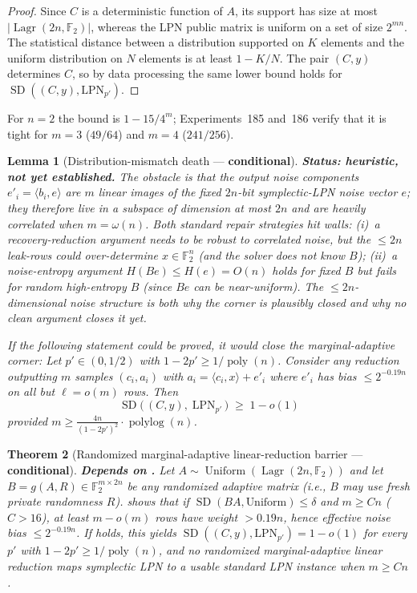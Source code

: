 \documentclass[11pt,a4paper]{article}
\theoremstyle{plain}
\newtheorem{theorem}{Theorem}[section]
\newtheorem{lemma}[theorem]{Lemma}
\theoremstyle{definition}
\newcommand{\F}{\mathbb{F}}
\DeclareMathOperator{\Lagr}{Lagr}
\begin{document}
\begin{proof}
Since $C$ is a deterministic function of $A$, its support has size at most $|\Lagr(2n,\F_2)|$, whereas the LPN public matrix is uniform on a set of size $2^{mn}$.  The statistical distance between a distribution supported on $K$ elements and the uniform distribution on $N$ elements is at least $1-K/N$.  The pair $(C,y)$ determines $C$, so by data processing the same lower bound holds for $\operatorname{SD}((C,y),\mathrm{LPN}_{p'})$.
\end{proof}

For $n=2$ the bound is $1-15/4^m$; Experiments~185 and~186 verify that it is tight for $m=3$ ($49/64$) and $m=4$ ($241/256$).

\begin{lemma}[Distribution-mismatch death --- \textbf{conditional}]
\label{lem:m2}
\textbf{Status: heuristic, not yet established.}  The obstacle is that the output noise components $e'_i=\langle b_i,e\rangle$ are $m$ linear images of the fixed $2n$-bit symplectic-LPN noise vector $e$; they therefore live in a subspace of dimension at most $2n$ and are heavily correlated when $m=\omega(n)$.  Both standard repair strategies hit walls: (i)~a recovery-reduction argument needs  to be robust to correlated noise, but the $\le 2n$ leak-rows could over-determine $x\in\F_2^{n}$ (and the solver does not know $B$); (ii)~a noise-entropy argument $H(Be)\le H(e)=O(n)$ holds for fixed $B$ but fails for random high-entropy $B$ (since $Be$ can be near-uniform).  The $\le 2n$-dimensional noise structure is both why the corner is plausibly closed and why no clean argument closes it yet.

\emph{If} the following statement could be proved, it would close the marginal-adaptive corner: Let $p'\in(0,1/2)$ with $1-2p'\ge 1/\operatorname{poly}(n)$.  Consider any reduction outputting $m$ samples $(c_i,a_i)$ with $a_i=\langle c_i,x\rangle+e'_i$ where $e'_i$ has bias $\le 2^{-0.19n}$ on all but $\ell=o(m)$ rows.  Then
\[
\operatorname{SD}\bigl(\,(C,y),\;\mathrm{LPN}_{p'}\,\bigr)
\;\ge\;
1-o(1)
\]
provided $m\ge \frac{4n}{(1-2p')^{2}}\cdot\operatorname{polylog}(n)$.
\end{lemma}

\begin{theorem}[Randomized marginal-adaptive linear-reduction barrier --- \textbf{conditional}]
\label{thm:marginal-adaptive}
\textbf{Depends on .}  Let $A\sim\operatorname{Uniform}(\Lagr(2n,\F_2))$ and let $B=g(A,R)\in\F_2^{m\times 2n}$ be any randomized adaptive matrix (i.e., $B$ may use fresh private randomness $R$).   shows that if $\operatorname{SD}(BA,\text{Uniform})\le\delta$ and $m\ge Cn$ ($C>16$), at least $m-o(m)$ rows have weight $>0.19n$, hence effective noise bias $\le 2^{-0.19n}$.  If  holds, this yields $\operatorname{SD}((C,y),\mathrm{LPN}_{p'})=1-o(1)$ for every $p'$ with $1-2p'\ge 1/\operatorname{poly}(n)$, and no randomized marginal-adaptive linear reduction maps symplectic LPN to a usable standard LPN instance when $m\ge Cn$.
\end{theorem}
\end{document}
